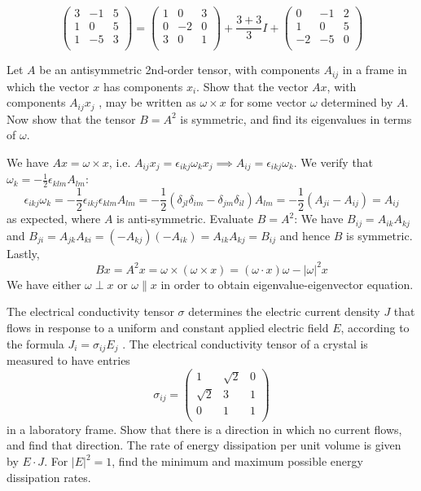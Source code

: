 \documentclass[a4paper]{article}
\begin{document}
\begin{ans}
$$\begin{pmatrix}3&-1&5\\1&0&5\\1&-5&3\\\end{pmatrix}=\begin{pmatrix}1&0&3\\0&-2&0\\3&0&1\\\end{pmatrix}+\frac{3+3}{3}I+\begin{pmatrix}0&-1&2\\1&0&5\\-2&-5&0\\\end{pmatrix}$$
\end{ans}
\newpage
\begin{qns}
Let $A$ be an antisymmetric 2nd-order tensor, with components $A_{ij}$ in a frame in which the vector $x$ has components $x_i$. Show that the vector $Ax$, with components $A_{ij}x_j$ , may be written as $\omega\times x$ for some vector $\omega$ determined by $A$. Now show that the tensor $B=A^2$ is symmetric, and find its eigenvalues in terms of $\omega$.
\end{qns}
\begin{ans}
We have $Ax=\omega\times x$, i.e. $A_{ij}x_j=\epsilon_{ikj}\omega_kx_j\implies A_{ij}=\epsilon_{ikj}\omega_k$. We verify that $\omega_k=-\frac{1}{2}\epsilon_{klm}A_{lm}$:
$$\epsilon_{ikj}\omega_k=-\frac{1}{2}\epsilon_{ikj}\epsilon_{klm}A_{lm}=-\frac{1}{2}(\delta_{jl}\delta_{im}-\delta_{jm}\delta_{il})A_{lm}=-\frac{1}{2}(A_{ji}-A_{ij})=A_{ij}$$
as expected, where $A$ is anti-symmetric. Evaluate $B=A^2$: We have $B_{ij}=A_{ik}A_{kj}$ and $B_{ji}=A_{jk}A_{ki}=(-A_{kj})(-A_{ik})=A_{ik}A_{kj}=B_{ij}$ and hence $B$ is symmetric. Lastly,
$$Bx=A^2x=\omega\times(\omega\times x)=(\omega\cdot x)\omega-|\omega|^2x$$
We have either $\omega\perp x$ or $\omega\parallel x$ in order to obtain eigenvalue-eigenvector equation.
\end{ans}
\begin{qns}
The electrical conductivity tensor $\sigma$ determines the electric current density $J$ that flows in response to a uniform and constant applied electric field $E$, according to the formula $J_i=\sigma_{ij}E_j$ . The electrical conductivity tensor of a crystal is measured to have entries
$$\sigma_{ij}=\begin{pmatrix}1&\sqrt{2}&0\\\sqrt{2}&3&1\\0&1&1\\\end{pmatrix}$$
in a laboratory frame. Show that there is a direction in which no current flows, and find that direction. The rate of energy dissipation per unit volume is given by $E\cdot J$. For $|E|^2 = 1$, find the minimum and maximum possible energy dissipation rates.
\end{qns}
\end{document}
